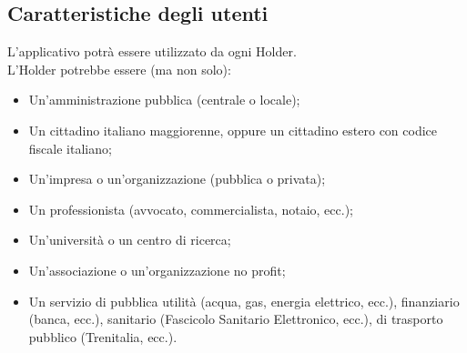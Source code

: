 \subsection{Caratteristiche degli utenti}
L’applicativo potrà essere utilizzato da ogni Holder. \\
L'Holder potrebbe essere (ma non solo): 
\begin{itemize}
    \item Un’amministrazione pubblica (centrale o locale);
    \item Un cittadino italiano maggiorenne, oppure un cittadino estero con codice fiscale italiano;
    \item Un’impresa o un’organizzazione (pubblica o privata);
    \item Un professionista (avvocato, commercialista, notaio, ecc.);
    \item Un’università o un centro di ricerca;
    \item Un’associazione o un’organizzazione no profit;
    \item Un servizio di pubblica utilità (acqua, gas, energia elettrico, ecc.), finanziario (banca, ecc.), sanitario (Fascicolo Sanitario Elettronico, ecc.), 
di trasporto pubblico (Trenitalia, ecc.).
\end{itemize}
